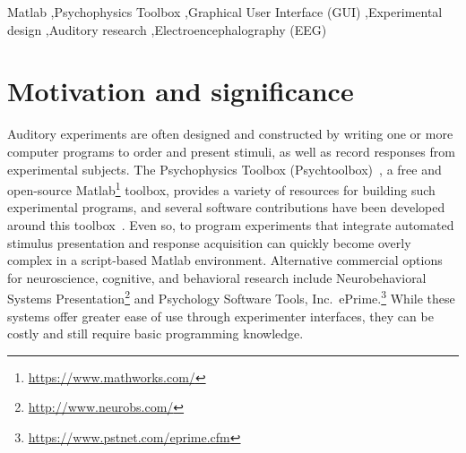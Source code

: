 \documentclass[preprint,12pt, a4paper]{elsarticle}
\begin{document}
\begin{frontmatter}
\begin{keyword}
Matlab \sep Psychophysics Toolbox \sep Graphical User Interface (GUI) \sep Experimental design \sep Auditory research \sep Electroencephalography (EEG)



\end{keyword}

\end{frontmatter}



\section{Motivation and significance}

Auditory experiments are often designed and constructed by writing one or more computer programs to order and present stimuli, as well as record responses from experimental subjects. The Psychophysics Toolbox (Psychtoolbox)~\cite{brainard1997thePsychophysicsToolbox}, a free and open-source Matlab\footnote{\url{https://www.mathworks.com/}} toolbox, provides a variety of resources for building such experimental programs, and several software contributions have been developed around this toolbox~\cite{cornelissen2002theEyelinkToolbox,schwarzbach2011aSimpleFramework,pelli1997}. Even so, to program experiments that integrate automated stimulus presentation and response acquisition can quickly become overly complex in a script-based Matlab environment. Alternative commercial options for neuroscience, cognitive, and behavioral research include Neurobehavioral Systems Presentation\footnote{\url{http://www.neurobs.com/}} and Psychology Software Tools, Inc.\ ePrime.\footnote{\url{https://www.pstnet.com/eprime.cfm}} While these systems offer greater ease of use through experimenter interfaces, they can be costly and still require basic programming knowledge. 
\end{document}
